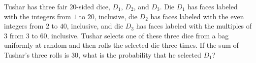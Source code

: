 Tushar has three fair $20$-sided dice, $D_1$, $D_2$, and $D_3$. Die $D_1$ has faces labeled with the integers from $1$ to $20$, inclusive, die $D_2$ has faces labeled with the even integers from $2$ to $40$, inclusive, and die $D_3$ has faces labeled with the multiples of $3$ from $3$ to $60$, inclusive. Tushar selects one of these three dice from a bag uniformly at random and then rolls the selected die three times. If the sum of Tushar's three rolls is $30$, what is the probability that he selected $D_1$?
